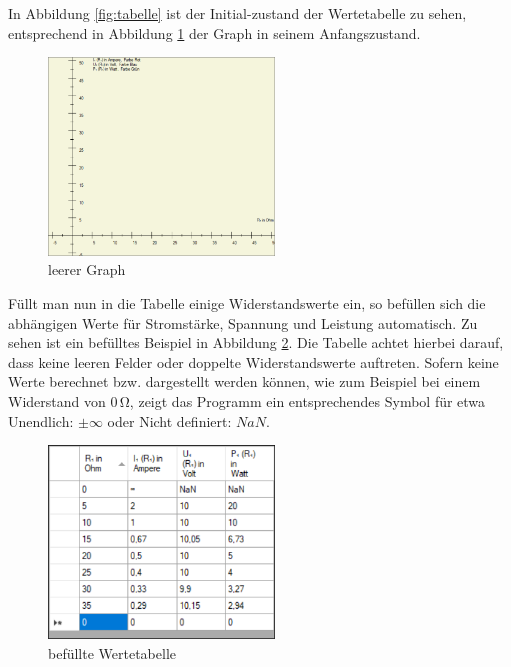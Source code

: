 \documentclass[a4paper]{article}
\begin{document}
    In Abbildung \ref{fig:tabelle} ist der Initial-zustand der Wertetabelle zu sehen, entsprechend in Abbildung \ref{fig:graph} der Graph in seinem Anfangszustand.
    \begin{figure}[!h]
        \begin{center}
            \includegraphics[width=6cm]{img/graph}
            \caption{leerer Graph}
            \label{fig:graph}
        \end{center}
    \end{figure}

    Füllt man nun in die Tabelle einige Widerstandswerte ein, so befüllen sich die abhängigen Werte für Stromstärke, Spannung und Leistung automatisch.
    Zu sehen ist ein befülltes Beispiel in Abbildung \ref{fig:tabellebefuellt}.
    Die Tabelle achtet hierbei darauf, dass keine leeren Felder oder doppelte Widerstandswerte auftreten.
    Sofern keine Werte berechnet bzw. dargestellt werden können, wie zum Beispiel bei einem Widerstand von $0\,\si{\ohm}$, zeigt das Programm ein entsprechendes Symbol für etwa \glqq Unendlich\grqq{}: $\pm\infty$ oder \glqq Nicht definiert\grqq{}: $NaN$.
    \begin{figure}[!h]
        \begin{center}
            \includegraphics[width=6cm]{img/tabellebefuellt}
            \caption{befüllte Wertetabelle}
            \label{fig:tabellebefuellt}
        \end{center}
    \end{figure}
\end{document}
